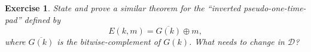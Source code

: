 \documentclass[11pt]{article}
\newtheorem{exercise}{Exercise}
\newtheorem{theorem}{Theorem}
\newcommand{\getsr}
  {{\:\stackrel{\raisebox{-2pt}{${\scriptscriptstyle \hspace{0.2em}\$}$}}
   {\leftarrow}\:}}
\newcommand{\msgs}{\mathcal{M}}
\newcommand{\ctxts}{\mathcal{C}}
\newcommand{\keys}{\mathcal{K}}
\newcommand{\Enc}{\mathsf{Enc}}
\newcommand{\Dec}{\mathsf{Dec}}
\newcommand{\calD}{\mathcal{D}}
\newcommand{\calA}{\mathcal{A}}
\newcommand{\Adv}{\mathbf{Adv}}
\newcommand{\AdvPRG}[2]{\Adv^{\mathrm{prg}}_{#1}({#2})}
\newcommand{\bits}{\{0,1\}}
\newcommand{\bK}{\mathbf{K}}
\newcommand{\bU}{\mathbf{U}}
\newcommand{\hatb}{\hat{b}}
\newcommand{\ExptOTCPA}{\mathbf{Expt}^{\mathrm{ot\mbox{-}cpa}}}
\newcommand{\AdvOTCPA}[2]{\Adv^{\mathrm{ot\mbox{-}cpa}}_{#1}({#2})}
\newcommand{\Piotp}{\Pi_\mathrm{otp}}
\begin{document}
\begin{exercise}
    State and prove a similar theorem for the ``inverted pseudo-one-time-pad''
    defined by
    \[
        E(k,m) = \overline{G(k)}\oplus m,
    \]
    where $\overline{G(k)}$ is the bitwise-complement of $G(k)$. What
    needs to change in $\calD$?
\end{exercise}




\end{document}
